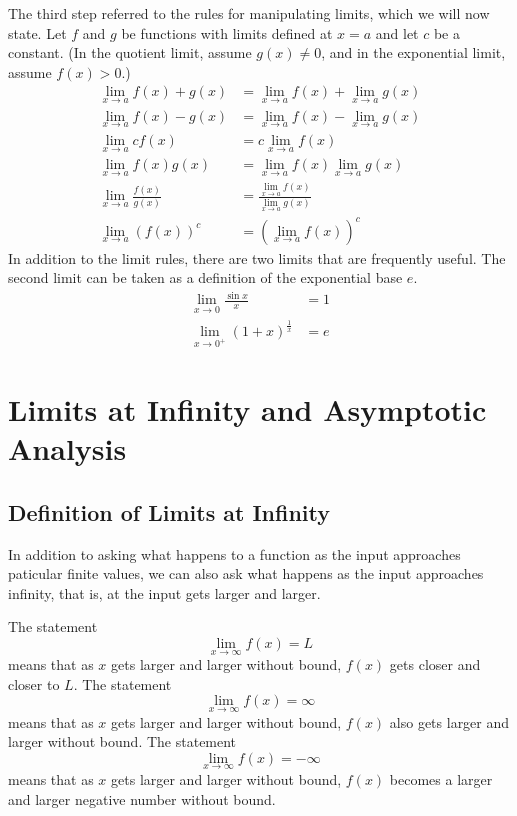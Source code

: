\documentclass[fleqn]{report}
\begin{document}
The third step referred to the rules for manipulating limits,
which we will now state.
Let $f$ and $g$ be functions with limits defined at $x=a$ and
let $c$ be a constant. (In the quotient limit, assume $g(x)
\neq 0$, and in the exponential limit, assume $f(x) > 0$.)
\begin{align*}
\lim_{x \rightarrow a} f(x) + g(x) & = 
\lim_{x \rightarrow a} f(x) + 
\lim_{x \rightarrow a} g(x) \\
\lim_{x \rightarrow a} f(x) - g(x) & = 
\lim_{x \rightarrow a} f(x) - 
\lim_{x \rightarrow a} g(x) \\
\lim_{x \rightarrow a} c f(x) & = 
c \lim_{x \rightarrow a} f(x) \\
\lim_{x \rightarrow a} f(x) g(x) & = 
\lim_{x \rightarrow a} f(x) 
\lim_{x \rightarrow a} g(x) \\
\lim_{x \rightarrow a} \frac{f(x)}{g(x)} & = 
\frac{\lim_{x \rightarrow a} f(x)}
{\lim_{x \rightarrow a} g(x)} \\
\lim_{x \rightarrow a} (f(x))^c & = 
(\lim_{x \rightarrow a} f(x))^c 
\end{align*}
In addition to the limit rules, there are two limits that are
frequently useful.  The second limit can be taken as a
definition of the exponential base $e$. 
\begin{align*}
\lim_{x \rightarrow 0} \frac{\sin x}{x} & = 1 \\
\lim_{x \rightarrow 0^+} \left( 1 + x \right)^{\frac{1}{x}} & = e
\end{align*}

\chapter{Limits at Infinity and Asymptotic Analysis }
\label{Limits at Infinity}

\section*{Definition of Limits at Infinity}

In addition to asking what happens to a function as the input
approaches paticular finite values, we can also ask what
happens as the input approaches infinity, that is, at the
input gets larger and larger. 

The statement
\begin{equation*}
\lim_{x \rightarrow \infty} f(x) = L
\end{equation*}
means that as $x$ gets larger and larger without bound, $f(x)$
gets closer and closer to $L$. The statement
\begin{equation*}
\lim_{x \rightarrow \infty} f(x) = \infty
\end{equation*}
means that as $x$ gets larger and larger without bound, $f(x)$
also gets larger and larger without bound. The statement 
\begin{equation*}
\lim_{x \rightarrow \infty} f(x) = -\infty
\end{equation*}
means that as $x$ gets larger and larger without bound, $f(x)$
becomes a larger and larger negative number without bound.
\end{document}
